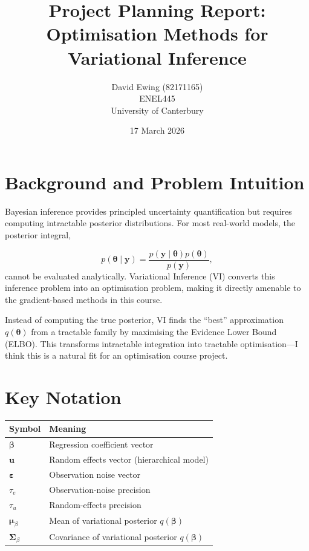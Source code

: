 \documentclass[11pt]{article}
\title{Project Planning Report:\\
Optimisation Methods for Variational Inference}
\author{David Ewing (82171165)\\
ENEL445  \\
University of Canterbury}
\date{17 March 2026}
\begin{document}
\maketitle

\section*{Background and Problem Intuition}

 

Bayesian inference provides principled uncertainty quantification but requires computing intractable posterior distributions. For most real-world models, the posterior integral, \par

\begin{equation*}
    p(\bm{\theta} \mid \bm{y}) = \frac{p(\bm{y} \mid \bm{\theta})p(\bm{\theta})}{p(\bm{y})},
\end{equation*}
\noindent 
cannot be evaluated analytically. Variational Inference (VI) converts this inference problem into an optimisation problem, making it directly amenable to the gradient-based methods in this course. \vspace{2em}

 

Instead of computing the true posterior, VI finds the ``best'' approximation $q(\bm{\theta})$ from a tractable family by maximising the Evidence Lower Bound (ELBO). This transforms intractable integration into tractable optimisation---I think this is a natural fit for an optimisation course project.

\section*{Key Notation}

\begin{center}
\begin{tabular}{ll}
\hline
Symbol & Meaning \\
\hline
$\bm{\beta}$ & Regression coefficient vector \\
$\bm{u}$ & Random effects vector (hierarchical model) \\
$\bm{\varepsilon}$ & Observation noise vector \\
$\tau_e$ & Observation-noise precision \\
$\tau_u$ & Random-effects precision \\
$\bm{\mu}_\beta$ & Mean of variational posterior $q(\bm{\beta})$ \\
$\bm{\Sigma}_\beta$ & Covariance of variational posterior $q(\bm{\beta})$ \\
\hline
\end{tabular}
\end{center}
\newpage
\end{document}
